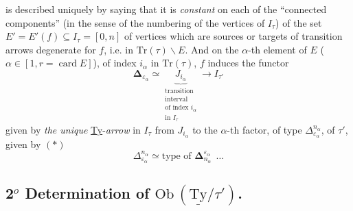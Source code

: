 \documentclass[11pt]{article}
\newcommand{\printedpage}[1]{\marginpar{\footnotesize p.~#1}}
\newcommand{\msp}[1]{\marginpar{\footnotesize [#1]}}
\newcommand{\uTy}{\underline{\mathrm{Ty}}}
\begin{document}
\printedpage{29}
\msp{page 45}is described uniquely by saying that it is \textit{constant} on each of the ``connected components'' (in the sense of the numbering of the vertices of $I_\tau$) of the set $E' = E'(f) \subseteq I_\tau = [0,n]$ of vertices which are sources or targets of transition arrows degenerate for $f$, i.e. in $\mathrm{Tr}(\tau)\backslash E$. And on the $\alpha$-th element of $E$ ($\alpha \in [1, r = \operatorname{card} E]$), of index $i_\alpha$ in $\mathrm{Tr}(\tau)$, $f$ induces the functor
\[
\boldsymbol{\Delta}_{\varepsilon_\alpha} \simeq \underbrace{J_{i_\alpha}}_{\substack{\text{transition}\\ \text{interval}\\ \text{of index } i_\alpha\\ \text{in } I_\tau}} \longrightarrow I_{\tau'}
\]
given by \textit{the unique} \underline{Ty}-\textit{arrow} in $I_\tau$ from $J_{i_\alpha}$ to the $\alpha$-th factor, of type $\Delta^{n_\alpha}_{\varepsilon_\alpha}$, of $\tau'$, given by $(*)$
\[
\Delta^{n_\alpha}_{\varepsilon_\alpha} \simeq \text{type of } \boldsymbol{\Delta}^{\varepsilon_\alpha}_{n_\alpha}\ \ \ldots
\]

\subsection*{2$^o$ Determination of $\mathrm{Ob}\,(\uTy/\tau')$.}
\end{document}
